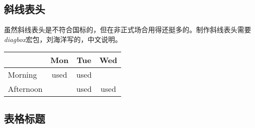 

\subsection{斜线表头}

虽然斜线表头是不符合国标的，但在非正式场合用得还挺多的。制作斜线表头需要\emph{diagbox}宏包，刘海洋写的，中文说明。

\begin{codeshow}
    \centering
    \begin{tabular}{|l|ccc|}
        \hline
        \diagbox{Time}{Room}{Day}
            &Mon&Tue&Wed\\
        \hline
        Morning&used&used&\\
        Afternoon& &used&used\\
        \hline
    \end{tabular}
\end{codeshow}

\subsection{表格标题}

